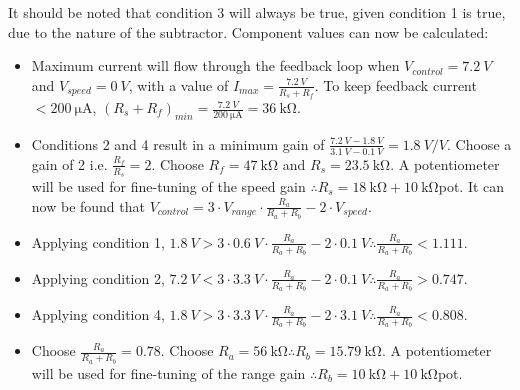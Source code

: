 \indent It should be noted that condition 3 will always be true, given condition 1 is true, due to the nature of the subtractor. Component values can now be calculated:
\begin{itemize}
    \item Maximum current will flow through the feedback loop when $V_{control} = \SI{7.2}{V}$  and $V_{speed} = \SI{0}{V}$, with a value of $I_{max} = \frac{\SI{7.2}{V}}{R_s + R_f}$.
          To keep feedback current $< \SI{200}{\micro\ampere}$, $(R_s + R_f)_{min} = \frac{\SI{7.2}{V}}{\SI{200}{\micro\ampere}} = \SI{36}{\kilo\ohm}$.
    \item Conditions 2 and 4 result in a minimum gain of $\frac{\SI{7.2}{V} - \SI{1.8}{V}}{\SI{3.1}{V} - \SI{0.1}{V}} = \SI{1.8}{V/V}$. Choose a gain of 2 i.e. $\frac{R_f}{R_s} = 2$.
          Choose $R_f = \SI{47}{\kilo\ohm}$ and $R_s = \SI{23.5}{\kilo\ohm}$. A potentiometer will be used for fine-tuning of the speed gain $\therefore R_s = \SI{18}{\kilo\ohm} + \SI{10}{\kilo\ohm}$pot.
          It can now be found that $V_{control} = 3 \cdot V_{range} \cdot \frac{R_a}{R_a + R_b} - 2 \cdot V_{speed}$.
    \item Applying condition 1, $\SI{1.8}{V} > 3 \cdot \SI{0.6}{V} \cdot \frac{R_a}{R_a + R_b} - 2 \cdot \SI{0.1}{V} \therefore \frac{R_a}{R_a + R_b} < 1.111$.
    \item Applying condition 2, $\SI{7.2}{V} < 3 \cdot \SI{3.3}{V} \cdot \frac{R_a}{R_a + R_b} - 2 \cdot \SI{0.1}{V} \therefore \frac{R_a}{R_a + R_b} > 0.747$.
    \item Applying condition 4, $\SI{1.8}{V} > 3 \cdot \SI{3.3}{V} \cdot \frac{R_a}{R_a + R_b} - 2 \cdot \SI{3.1}{V} \therefore \frac{R_a}{R_a + R_b} < 0.808$.
    \item Choose $\frac{R_a}{R_a + R_b} = 0.78$. Choose $R_a = \SI{56}{\kilo\ohm} \therefore R_b = \SI{15.79}{\kilo\ohm}$. A potentiometer will be used for fine-tuning of the range gain
          $\therefore R_b = \SI{10}{\kilo\ohm} + \SI{10}{\kilo\ohm}$pot.
\end{itemize}